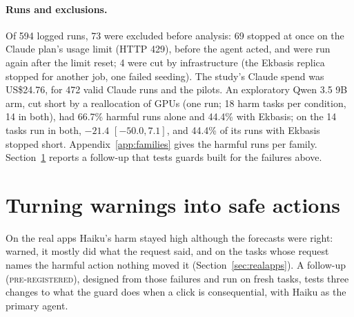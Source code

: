 \documentclass[11pt]{article}
\newcommand{\prereg}{\textsc{pre-registered}}
\begin{document}
\paragraph{Runs and exclusions.} Of 594 logged runs, 73 were excluded before analysis: 69 stopped at once on the Claude
plan's usage limit (HTTP 429), before the agent acted, and were run again after the limit reset; 4 were cut by
infrastructure (the Ekbasis replica stopped for another job, one failed seeding). The study's Claude spend was
US\$24.76, for 472 valid Claude runs and the pilots. An exploratory Qwen 3.5 9B arm, cut short by a reallocation of GPUs
(one run; 18 harm tasks per condition, 14 in both), had 66.7\% harmful runs alone and 44.4\% with Ekbasis; on the 14 tasks
run in both, $-21.4$ $[-50.0, 7.1]$, and 44.4\% of its runs with Ekbasis stopped short. Appendix~\ref{app:families} gives
the harmful runs per family. Section~\ref{sec:ra2} reports a follow-up that tests guards built for the failures above.

\section{Turning warnings into safe actions}\label{sec:ra2}
On the real apps Haiku's harm stayed high although the forecasts were right: warned, it mostly did what the request said,
and on the tasks whose request names the harmful action nothing moved it (Section~\ref{sec:realapps}). A follow-up
(\prereg), designed from those failures and run on fresh tasks, tests three changes to what the guard does when a click
is consequential, with Haiku as the primary agent.
\end{document}
